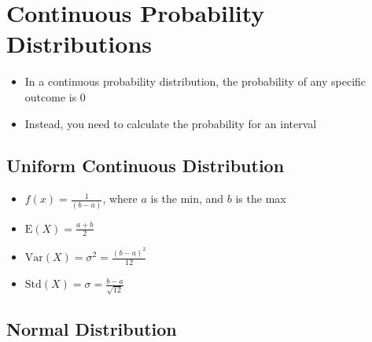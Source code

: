 \documentclass{article}
\begin{document}
\section{Continuous Probability Distributions}

\begin{itemize}
    \item In a continuous probability distribution, the probability of any specific outcome is 0
    \item Instead, you need to calculate the probability for an interval
\end{itemize} 

\subsection{Uniform Continuous Distribution}

\begin{itemize}
    \item $f(x)=\frac{1}{(b-a)}$, where $a$ is the min, and $b$ is the max
    \item $\text{E}(X)=\frac{a+b}{2}$
    \item $\text{Var}(X)=\sigma^2=\frac{(b-a)^2}{12}$
    \item $\text{Std}(X)=\sigma=\frac{b-a}{\sqrt{12}}$
\end{itemize}

\subsection{Normal Distribution}
\end{document}
